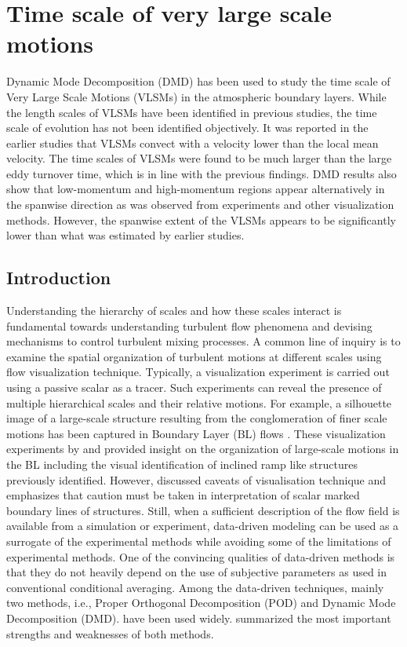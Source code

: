 \chapter{Time scale of very large scale motions}\label{chap:chap3}
Dynamic Mode Decomposition (DMD) has been used to study the time scale of Very Large Scale Motions (VLSMs) in the atmospheric boundary layers. While the length scales of VLSMs have been identified in previous studies, the time scale of evolution has not been identified objectively. It was reported in the earlier studies that VLSMs convect with a velocity lower than the local mean velocity. The time scales of VLSMs were found to be much larger than the large eddy turnover time, which is in line with the previous findings. DMD results also show that low-momentum and high-momentum regions appear alternatively in the spanwise direction as was observed from experiments and other visualization methods. However, the spanwise extent of the VLSMs appears to be significantly lower than what was estimated by earlier studies.


\section{Introduction}
Understanding the hierarchy of scales and how these scales interact is fundamental towards understanding  turbulent flow phenomena and devising mechanisms to control turbulent mixing processes. A common line of inquiry is to examine the spatial organization of turbulent motions at different scales using flow visualization technique. Typically, a visualization experiment is carried out using a passive scalar as a tracer. Such experiments can reveal the presence of multiple hierarchical scales and their relative motions. For example, a silhouette image of a large-scale structure resulting from the conglomeration of finer scale motions has been captured in  Boundary Layer (BL) flows \citep{falco_pof_77, hommema_adrian_blm_03}. These visualization experiments by \citet{falco_pof_77} and \citet{hommema_adrian_blm_03} provided insight on the organization of large-scale motions in the BL including the visual identification of inclined ramp like structures previously identified. However, \citet{hussain_1986_jfm} discussed caveats of visualisation technique and emphasizes that caution must be taken in interpretation of scalar marked boundary lines of structures. Still, when a sufficient description of the flow field is available from a simulation or experiment, data-driven modeling can be used as a surrogate of the experimental methods while avoiding some of the limitations of experimental methods. One of the convincing qualities of data-driven methods is that they  do not heavily depend on the use of subjective parameters as used in conventional conditional averaging. Among the data-driven techniques, mainly two methods, i.e., Proper Orthogonal Decomposition (POD) \citep[e.g., ][]{li_bouzeid_blm_2011,muld_compFluids_2012} and Dynamic Mode Decomposition (DMD). \citep[e.g., ][]{bagheri_jfm2013,liu_ExpF_2015,muld_compFluids_2012} have been used widely. \citet{taira_arxiv_2017} summarized the most important strengths and weaknesses of both methods. 

